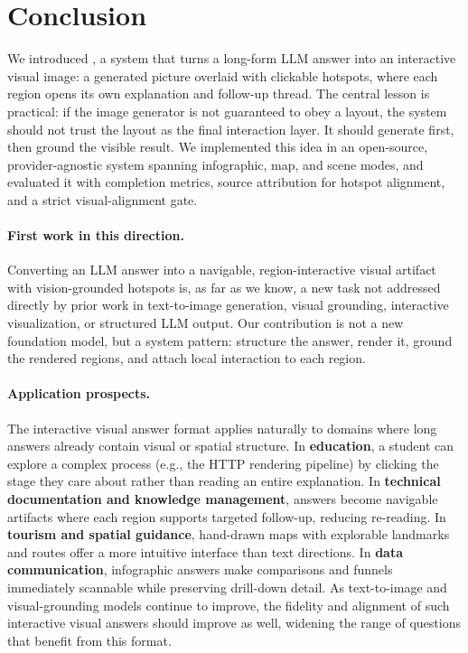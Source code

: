\section{Conclusion}
\label{sec:conclusion}

We introduced \method{}, a system that turns a long-form LLM answer into an
interactive visual image: a generated picture overlaid with clickable hotspots,
where each region opens its own explanation and follow-up thread. The central
lesson is practical: if the image generator is not guaranteed to obey a layout,
the system should not trust the layout as the final interaction layer. It
should generate first, then ground the visible result. We implemented this idea
in an open-source, provider-agnostic system spanning infographic, map, and
scene modes, and evaluated it with completion metrics, source attribution for
hotspot alignment, and a strict visual-alignment gate.

\paragraph{First work in this direction.}
Converting an LLM answer into a navigable, region-interactive visual artifact
with vision-grounded hotspots is, as far as we know, a new task not addressed
directly by prior work in text-to-image generation, visual grounding,
interactive visualization, or structured LLM output. Our contribution is not a
new foundation model, but a system pattern: structure the answer, render it,
ground the rendered regions, and attach local interaction to each region.

\paragraph{Application prospects.}
The interactive visual answer format applies naturally to domains where long
answers already contain visual or spatial structure. In
\textbf{education}, a student can explore a complex process (e.g., the HTTP
rendering pipeline) by clicking the stage they care about rather than reading
an entire explanation. In \textbf{technical documentation and knowledge
management}, answers become navigable artifacts where each region supports
targeted follow-up, reducing re-reading. In \textbf{tourism and spatial
guidance}, hand-drawn maps with explorable landmarks and routes offer a more
intuitive interface than text directions. In \textbf{data communication},
infographic answers make comparisons and funnels immediately scannable while
preserving drill-down detail. As text-to-image and visual-grounding models
continue to improve, the fidelity and alignment of such interactive visual
answers should improve as well, widening the range of questions that benefit
from this format.

